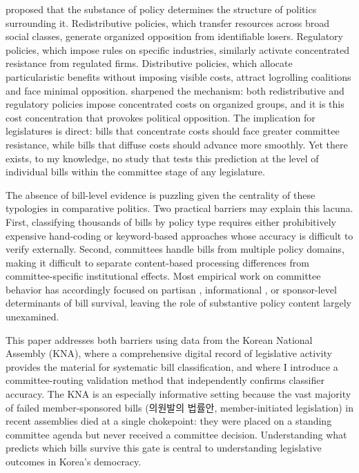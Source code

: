 \documentclass[11pt]{article}
\begin{document}
\citet{lowi1964} proposed that the substance of policy determines the structure of politics surrounding it. Redistributive policies, which transfer resources across broad social classes, generate organized opposition from identifiable losers. Regulatory policies, which impose rules on specific industries, similarly activate concentrated resistance from regulated firms. Distributive policies, which allocate particularistic benefits without imposing visible costs, attract logrolling coalitions and face minimal opposition. \citet{wilson1980} sharpened the mechanism: both redistributive and regulatory policies impose concentrated costs on organized groups, and it is this cost concentration that provokes political opposition. The implication for legislatures is direct: bills that concentrate costs should face greater committee resistance, while bills that diffuse costs should advance more smoothly. Yet there exists, to my knowledge, no study that tests this prediction at the level of individual bills within the committee stage of any legislature.

The absence of bill-level evidence is puzzling given the centrality of these typologies in comparative politics. Two practical barriers may explain this lacuna. First, classifying thousands of bills by policy type requires either prohibitively expensive hand-coding or keyword-based approaches whose accuracy is difficult to verify externally. Second, committees handle bills from multiple policy domains, making it difficult to separate content-based processing differences from committee-specific institutional effects. Most empirical work on committee behavior has accordingly focused on partisan \citep{cox2005}, informational \citep{krehbiel1991}, or sponsor-level \citep{volden2014} determinants of bill survival, leaving the role of substantive policy content largely unexamined.

This paper addresses both barriers using data from the Korean National Assembly (KNA), where a comprehensive digital record of legislative activity provides the material for systematic bill classification, and where I introduce a committee-routing validation method that independently confirms classifier accuracy. The KNA is an especially informative setting because the vast majority of failed member-sponsored bills (의원발의 법률안, member-initiated legislation) in recent assemblies died at a single chokepoint: they were placed on a standing committee agenda but never received a committee decision. Understanding what predicts which bills survive this gate is central to understanding legislative outcomes in Korea's democracy.
\end{document}
